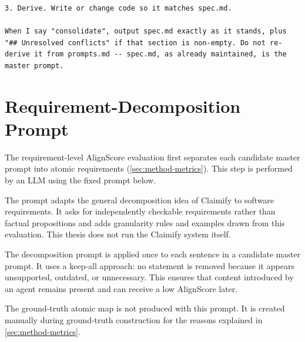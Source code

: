 \begin{lstlisting}[breaklines=true, basicstyle=\small\ttfamily, caption={Experiment~1 \texttt{spec\_guided} governance instruction, reproduced verbatim.}, label={lst:governance}]
3. Derive. Write or change code so it matches spec.md.

When I say "consolidate", output spec.md exactly as it stands, plus "## Unresolved conflicts" if that section is non-empty. Do not re-derive it from prompts.md -- spec.md, as already maintained, is the master prompt.
\end{lstlisting}

\section{Requirement-Decomposition Prompt}
\label{sec:decomp-prompt}

The requirement-level AlignScore evaluation first separates each candidate
master prompt into atomic requirements
(\cref{sec:method-metrics}). This step is performed by an LLM using the fixed
prompt below.

The prompt adapts the general decomposition idea of Claimify
\citep{metropolitansky2025claimify} to software requirements. It asks for
independently checkable requirements rather than factual propositions and
adds granularity rules and examples drawn from this evaluation. This thesis
does not run the Claimify system itself.

The decomposition prompt is applied once to each sentence in a candidate
master prompt. It uses a keep-all approach: no statement is removed because
it appears unsupported, outdated, or unnecessary. This ensures that content
introduced by an agent remains present and can receive a low AlignScore later.

The ground-truth atomic map is not produced with this prompt. It is created
manually during ground-truth construction for the reasons explained in
\cref{sec:method-metrics}.

